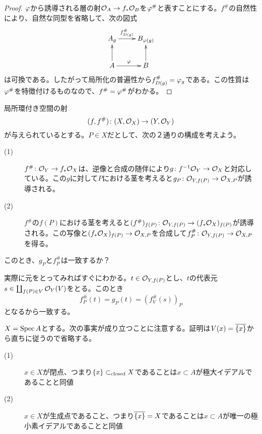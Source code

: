 \begin{proof}
  ${\varphi}$から誘導される層の射$\mathcal{O}_A \to f_*\mathcal{O}_B$を${\varphi}^{\#}$と表すことにする。$f^{\#}$の自然性により、自然な同型を省略して、次の図式
  \[
  \xymatrix{
  A_g \ar[r]^-{ f^{\#}_{D(g)} } & B_{\vp(g)} \\
  A \ar[u] \ar[r]^-{\vp} & B \ar[u]
  }
  \]
  は可換である。したがって局所化の普遍性から$f^{\#}_{D(g)} = {\varphi}_g$である。この性質は${\varphi}^{\#}$を特徴付けるものなので、$f^{\#} = {\varphi}^{\#}$がわかる。
\end{proof}


\begin{que}
  局所環付き空間の射
  \[
  (f,f^{\#}) \colon (X,\mathcal{O}_X) \to (Y,\mathcal{O}_Y)
  \]
  が与えられているとする。$P \in X$だとして、次の２通りの構成を考えよう。
  \begin{description}
    \item[(1)] $f^{\#} \colon \mathcal{O}_Y \to f_* \mathcal{O}_X$は、逆像と合成の随伴により$g \colon f^{-1}\mathcal{O}_Y \to \mathcal{O}_X$と対応している。この$g$に対して$P$における茎を考えると$g_P \colon \mathcal{O}_{Y,f(P)} \to \mathcal{O}_{X,P}$が誘導される。
    \item[(2)] $f^{\#}$の$f(P)$における茎を考えると$(f^{\#})_{f(P)} \colon \mathcal{O}_{Y,f(P)} \to (f_* \mathcal{O}_X)_{f(P)}$が誘導される。この写像と$(f_* \mathcal{O}_X)_{f(P)} \to \mathcal{O}_{X,P}$を合成して$f^{\#}_P \colon \mathcal{O}_{Y,f(P)} \to \mathcal{O}_{X,P}$を得る。
  \end{description}
  このとき、$g_P$と$f^{\#}_P$は一致するか？
\end{que}
\begin{sol}
  実際に元をとってみればすぐにわかる。$t \in \mathcal{O}_{Y,f(P)}$とし、$t$の代表元$s \in \coprod_{f(P) \in V} \mathcal{O}_Y(V)$をとる。このとき
  \[
  f^{\#}_P (t) = g_P(t) = (f^{\#}_V(s))_P
  \]
  となるから一致する。
\end{sol}










\begin{rem}
  $X = \operatorname{Spec} A$とする。次の事実が成り立つことに注意する。証明は$V( x ) = \overline{\{ x \} }$から直ちに従うので省略する。
  \begin{description}
    \item[(1)] $x \in X$が閉点、つまり$\{x \} \subset_{\text{closed}} X$であることは$x \subset A$が極大イデアルであることと同値
    \item[(2)] $x \in X$が生成点であること、つまり$\overline{\{x\}}=X$であることは$x \subset A$が唯一の極小素イデアルであることと同値
  \end{description}
\end{rem}



